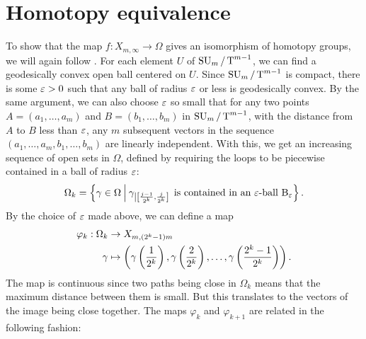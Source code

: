 \section{Homotopy equivalence}

To show that the map $f : X_{m,\infty} \to \Omega$
gives an isomorphism of homotopy groups, we will again follow
\cite{milnor}. For each element $U$ of $\operatorname{SU}_{m}/\operatorname{T}^{m-1}$, we can find a 
geodesically convex open ball centered on $U$. Since $\operatorname{SU}_{m}/\operatorname{T}^{m-1}$
is compact, there is some $\varepsilon > 0$ such that any ball of radius $\varepsilon$
or less is geodesically convex. By the same argument, we can also
choose $\varepsilon$ so small that for any two points $A= (a_1,\dots, a_m)$ and
$B=(b_1,\dots,b_m)$ in $\operatorname{SU}_{m}/\operatorname{T}^{m-1}$, with the distance from $A$ to $B$
less
than $\varepsilon$, any $m$ subsequent vectors in the sequence
$(a_1,\dots,a_m,b_1,\dots,b_m)$ are linearly
independent. 
With this, we get an increasing sequence of open sets in $\Omega$,
defined by requiring the loops to be piecewise contained in a ball of
radius $\varepsilon$:
\[ \Omega_k = \left\{ \gamma \in \Omega \: \Big\vert\:
  \gamma_{\left|\left[ \frac{j-1}{2^k},\frac{j}{2^k} \right]\right.} \text{ is
  contained in an $\varepsilon$-ball $\mathrm{B}_\varepsilon$}  \right\}. \]
By the choice of $\varepsilon$ made above, we can define a map
\begin{align*}
  \varphi_k : \Omega_k &\to X_{m,(2^k-1)m} \\
  \gamma &\mapsto \left( \gamma\left(\frac{1}{2^k}\right),
    \gamma\left(\frac{2}{2^k}\right), \dots,
    \gamma\left(\frac{2^k-1}{2^k}\right) \right).
\end{align*}
The map is continuous since two paths being close in $\Omega_k$ means
that the maximum distance between them is small. But this translates
to the vectors of the image being close together. The maps $\varphi_k$
and $\varphi_{k+1}$ are related in the following fashion:

